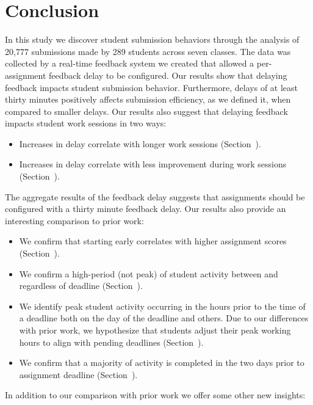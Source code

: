 \section{Conclusion} 
In this study we discover student submission behaviors through the analysis of
20,777 submissions made by 289 students across seven classes. The data was
collected by a real-time feedback system we created that allowed a
per-assignment feedback delay to be configured. Our results show that delaying
feedback impacts student submission behavior. Furthermore, delays of at least
thirty minutes positively affects submission efficiency, as we defined it, when
compared to smaller delays. Our results also suggest that delaying feedback
impacts student work sessions in two ways:

\begin{itemize}
\item Increases in delay correlate with longer work sessions
  (Section~).
\item Increases in delay correlate with less improvement during work sessions
  (Section~).
\end{itemize}

The aggregate results of the feedback delay suggests that assignments should be
configured with a thirty minute feedback delay. Our results also provide an
interesting comparison to prior work:

\begin{itemize}
\item We confirm that starting early correlates with higher assignment
  scores (Section~).
\item We confirm a high-period (not peak) of student activity between 
  and  regardless of deadline (Section~).
\item We identify peak student activity occurring in the hours prior to the
  time of a deadline both on the day of the deadline and others. Due to our
  differences with prior work, we hypothesize that students adjust their peak
  working hours to align with pending deadlines (Section~).
\item We confirm that a majority of activity is completed in the two days prior
  to assignment deadline (Section~).
\end{itemize}

In addition to our comparison with prior work we offer some other new insights:


